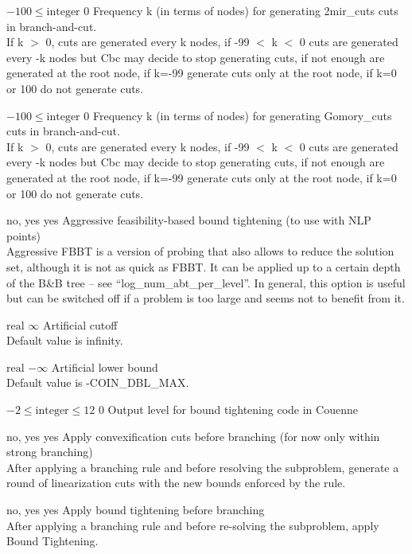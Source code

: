 %
{$-100\leq\textrm{integer}$}%
{$0$}%
{Frequency k (in terms of nodes) for generating 2mir\_cuts cuts in branch-and-cut.\\
If k $>$ 0, cuts are generated every k nodes, if -99 $<$ k $<$ 0 cuts are generated every -k nodes but Cbc may decide to stop generating cuts, if not enough are generated at the root node, if k=-99 generate cuts only at the root node, if k=0 or 100 do not generate cuts.}%
{}

%
{$-100\leq\textrm{integer}$}%
{$0$}%
{Frequency k (in terms of nodes) for generating Gomory\_cuts cuts in branch-and-cut.\\
If k $>$ 0, cuts are generated every k nodes, if -99 $<$ k $<$ 0 cuts are generated every -k nodes but Cbc may decide to stop generating cuts, if not enough are generated at the root node, if k=-99 generate cuts only at the root node, if k=0 or 100 do not generate cuts.}%
{}

%
{no, yes}%
{yes}%
{Aggressive feasibility-based bound tightening (to use with NLP points)\\
Aggressive FBBT is a version of probing that also allows to reduce the solution set, although it is not as quick as FBBT. It can be applied up to a certain depth of the B\&B tree -- see ``log\_num\_abt\_per\_level''. In general, this option is useful but can be switched off if a problem is too large and seems not to benefit from it.}%
{}

%
{$\textrm{real}$}%
{$\infty$}%
{Artificial cutoff\\
Default value is infinity.}%
{}

%
{$\textrm{real}$}%
{$-\infty$}%
{Artificial lower bound\\
Default value is -COIN\_DBL\_MAX.}%
{}

%
{$-2\leq\textrm{integer}\leq12$}%
{$0$}%
{Output level for bound tightening code in Couenne}%
{}

%
{no, yes}%
{yes}%
{Apply convexification cuts before branching (for now only within strong branching)\\
After applying a branching rule and before resolving the subproblem, generate a round of linearization cuts with the new bounds enforced by the rule.}%
{}

%
{no, yes}%
{yes}%
{Apply bound tightening before branching\\
After applying a branching rule and before re-solving the subproblem, apply Bound Tightening.}%
{}

